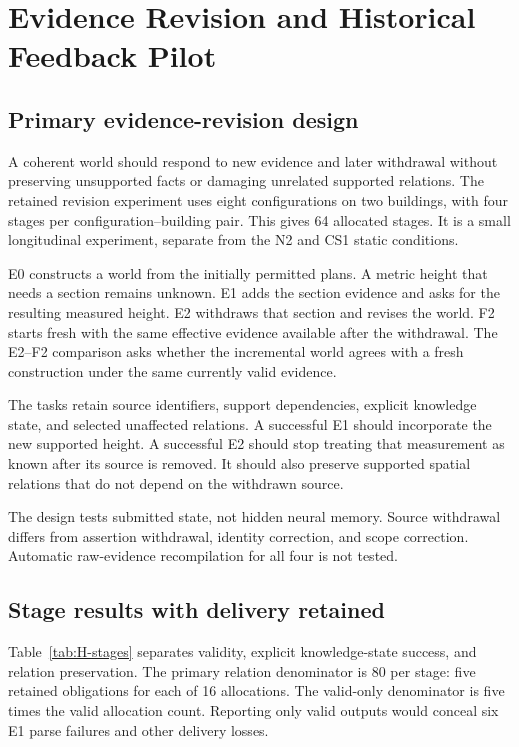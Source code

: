 \section{Evidence Revision and Historical Feedback Pilot}\label{app:H}
\subsection{Primary evidence-revision design}
A coherent world should respond to new evidence and later withdrawal without preserving unsupported facts or damaging unrelated supported relations. The retained revision experiment uses eight configurations on two buildings, with four stages per configuration--building pair. This gives 64 allocated stages. It is a small longitudinal experiment, separate from the N2 and CS1 static conditions.

E0 constructs a world from the initially permitted plans. A metric height that needs a section remains unknown. E1 adds the section evidence and asks for the resulting measured height. E2 withdraws that section and revises the world. F2 starts fresh with the same effective evidence available after the withdrawal. The E2--F2 comparison asks whether the incremental world agrees with a fresh construction under the same currently valid evidence.

The tasks retain source identifiers, support dependencies, explicit knowledge state, and selected unaffected relations. A successful E1 should incorporate the new supported height. A successful E2 should stop treating that measurement as known after its source is removed. It should also preserve supported spatial relations that do not depend on the withdrawn source.

The design tests submitted state, not hidden neural memory. Source withdrawal differs from assertion withdrawal, identity correction, and scope correction. Automatic raw-evidence recompilation for all four is not tested.

\subsection{Stage results with delivery retained}
Table~\ref{tab:H-stages} separates validity, explicit knowledge-state success, and relation preservation. The primary relation denominator is 80 per stage: five retained obligations for each of 16 allocations. The valid-only denominator is five times the valid allocation count. Reporting only valid outputs would conceal six E1 parse failures and other delivery losses.

